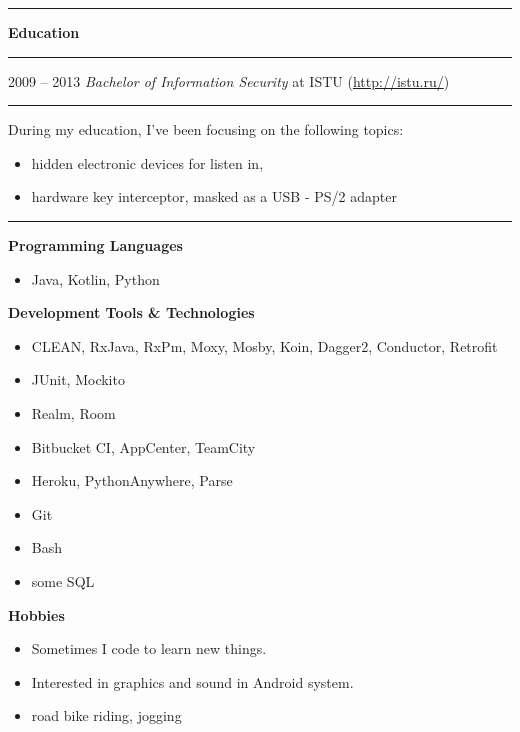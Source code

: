 \documentclass[11pt]{article}
\newcommand\CvSmallSkipLength{0.5em}
\newcommand\CvBigSkipLength{1em}
\newcommand\CvSkip[1]{\vspace{#1}}
\newcommand\CvSmallSkip{\CvSkip{\CvSmallSkipLength}}
\newcommand\CvBigSkip{\CvSkip{\CvBigSkipLength}}
\newcommand\CvSectionHeader[1]{\CvBigSkip\textbf{#1}\CvBigSkip}
\newcommand\CvRule{\begingroup\color{CvRuleColor}\hrule\endgroup}
\newcommand\CvWorkplaceHeader[5]{\begingroup%
  \CvRule%
  \fboxsep0pt%
  \colorbox{CvWorkplaceHeaderColor}{%
    \begin{minipage}{\linewidth-2\fboxsep}%
\CvSmallSkip%
#1 -- #2 \hfill \textit{#3} at #4 (\href{http://#5/}{#5})%
\CvSmallSkip%
    \end{minipage}%
  }%
  \CvRule%
\endgroup%
}
\newenvironment{CvWorkplaceDescription}{%
    \begingroup\setlength\parskip{\CvSmallSkipLength}%
  }{%
    \CvSmallSkip\endgroup%
  }
\begin{document}
\CvRule

\CvSectionHeader{Education}

\CvWorkplaceHeader{2009}{2013}{Bachelor of Information Security}{ISTU}{http://istu.ru/}

\begin{CvWorkplaceDescription}
During my education, I've been focusing on the following topics:
\begin{itemize}[noitemsep]
  \item hidden electronic devices for listen in,
  \item hardware key interceptor, masked as a USB - PS/2 adapter
\end{itemize}
\end{CvWorkplaceDescription}
\CvRule

\begin{minipage}[t]{.5\linewidth}
  \CvSectionHeader{Programming Languages}

  \begin{itemize}
    \item Java, Kotlin, Python
  \end{itemize}

  \CvSectionHeader{Development Tools \& Technologies}

  \begin{itemize}
 \item CLEAN, RxJava, RxPm, Moxy, Mosby, Koin, Dagger2, Conductor, Retrofit
\item  JUnit, Mockito
\item  Realm, Room
    \item Bitbucket CI, AppCenter, TeamCity
    \item Heroku, PythonAnywhere, Parse
   \item Git
   \item Bash
   \item some SQL
  \end{itemize}

  \CvSectionHeader{Hobbies}

  \begin{itemize}
    \item Sometimes I code to learn new things. 
 \item Interested in graphics and sound in Android system.
   \item road bike riding, jogging
  \end{itemize}
\end{minipage}
\end{document}
